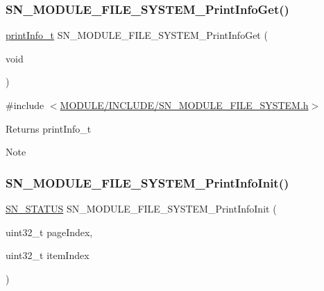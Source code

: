 \subsubsection{\texorpdfstring{S\+N\+\_\+\+M\+O\+D\+U\+L\+E\+\_\+\+F\+I\+L\+E\+\_\+\+S\+Y\+S\+T\+E\+M\+\_\+\+Print\+Info\+Get()}{SN\_MODULE\_FILE\_SYSTEM\_PrintInfoGet()}}
{\footnotesize\ttfamily \hyperlink{structprint__information}{print\+Info\+\_\+t} S\+N\+\_\+\+M\+O\+D\+U\+L\+E\+\_\+\+F\+I\+L\+E\+\_\+\+S\+Y\+S\+T\+E\+M\+\_\+\+Print\+Info\+Get (\begin{DoxyParamCaption}\item[{void}]{ }\end{DoxyParamCaption})}



{\ttfamily \#include $<$\hyperlink{SN__MODULE__FILE__SYSTEM_8h}{M\+O\+D\+U\+L\+E/\+I\+N\+C\+L\+U\+D\+E/\+S\+N\+\_\+\+M\+O\+D\+U\+L\+E\+\_\+\+F\+I\+L\+E\+\_\+\+S\+Y\+S\+T\+E\+M.\+h}$>$}

\begin{DoxyReturn}{Returns}
print\+Info\+\_\+t 
\end{DoxyReturn}
\begin{DoxyNote}{Note}

\end{DoxyNote}
\mbox{\label{group__MODULE__FILE__SYSTEM_gadbd5aafed31faed399abd08193a04bc8}} 
\subsubsection{\texorpdfstring{S\+N\+\_\+\+M\+O\+D\+U\+L\+E\+\_\+\+F\+I\+L\+E\+\_\+\+S\+Y\+S\+T\+E\+M\+\_\+\+Print\+Info\+Init()}{SN\_MODULE\_FILE\_SYSTEM\_PrintInfoInit()}}
{\footnotesize\ttfamily \hyperlink{group__SYSTEM__ERROR_ga4540713b9a7a18ce44d78c3a10f7442f}{S\+N\+\_\+\+S\+T\+A\+T\+US} S\+N\+\_\+\+M\+O\+D\+U\+L\+E\+\_\+\+F\+I\+L\+E\+\_\+\+S\+Y\+S\+T\+E\+M\+\_\+\+Print\+Info\+Init (\begin{DoxyParamCaption}\item[{uint32\+\_\+t}]{page\+Index,  }\item[{uint32\+\_\+t}]{item\+Index }\end{DoxyParamCaption})}



